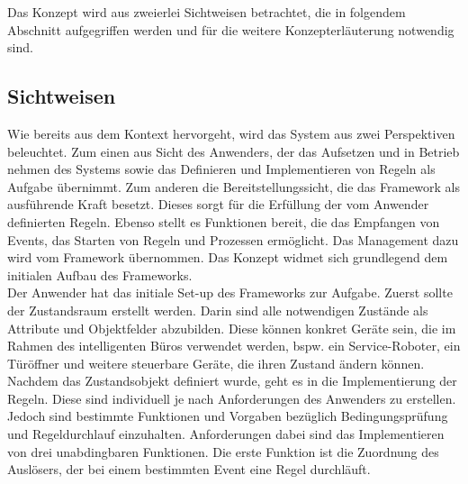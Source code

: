         Das Konzept wird aus zweierlei Sichtweisen betrachtet, die in folgendem Abschnitt aufgegriffen werden und für die weitere 
        Konzepterläuterung notwendig sind.
    
    \subsection{Sichtweisen}
    \label{subsec:sichtweisen}
        Wie bereits aus dem Kontext hervorgeht, wird das System aus zwei Perspektiven beleuchtet. Zum einen aus Sicht des Anwenders, 
        der das Aufsetzen und in Betrieb nehmen des Systems sowie das Definieren und Implementieren von Regeln als 
        Aufgabe übernimmt. Zum anderen die 
        Bereitstellungssicht, die das Framework als ausführende Kraft besetzt. Dieses sorgt für die Erfüllung der vom 
        Anwender definierten Regeln. Ebenso stellt es Funktionen bereit, die das Empfangen von Events, das Starten 
        von Regeln und Prozessen ermöglicht. Das Management dazu wird vom Framework übernommen. 
        Das Konzept widmet sich grundlegend dem initialen Aufbau des Frameworks. 
        \\
        \linebreak
        Der Anwender hat das initiale Set-up des Frameworks zur Aufgabe. Zuerst sollte der Zustandsraum erstellt werden. 
        Darin sind alle notwendigen Zustände als Attribute und Objektfelder abzubilden. Diese können konkret Geräte sein, die im Rahmen des 
        intelligenten Büros verwendet werden, bspw. ein Service-Roboter, ein Türöffner und weitere steuerbare Geräte, die 
        ihren Zustand ändern können. Nachdem das Zustandsobjekt 
        definiert wurde, geht es in die Implementierung der Regeln. Diese sind individuell je nach 
        Anforderungen des Anwenders zu erstellen. Jedoch sind bestimmte Funktionen und Vorgaben bezüglich Bedingungsprüfung 
        und Regeldurchlauf einzuhalten. Anforderungen dabei sind das Implementieren von drei unabdingbaren Funktionen. 
        Die erste Funktion ist die Zuordnung des Auslösers, der bei einem bestimmten Event eine Regel durchläuft. 
